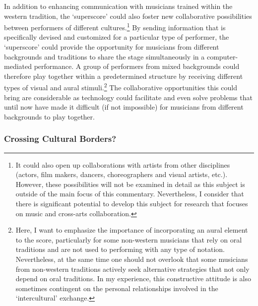 In addition to enhancing communication with musicians trained within the western tradition, the `superscore' could also foster new collaborative possibilities between performers of different cultures.\footnote{It could also open up collaborations with artists from other disciplines (actors, film makers, dancers, choreographers and visual artists, etc.). However, these possibilities will not be examined in detail as this subject is outside of the main focus of this commentary. Nevertheless, I consider that there is significant potential to develop this subject for research that focuses on music and cross-arts collaboration.} By sending information that is specifically devised and customized for a particular type of performer, the `superscore' could provide the opportunity for musicians from different backgrounds and traditions to share the stage simultaneously in a computer-mediated performance. A group of performers from mixed backgrounds could therefore play together within a predetermined structure by receiving different types of visual and aural stimuli.\footnote{Here, I want to emphasize the importance of incorporating an aural element to the score, particularly for some non-western musicians that rely on oral traditions and are not used to performing with any type of notation. Nevertheless,  at the same time one should not overlook that some musicians from non-western traditions actively seek alternative strategies that not only depend on oral traditions. In my experience, this constructive attitude is also sometimes contingent on the personal relationships involved in the `intercultural' exchange.} The collaborative opportunities this could bring are considerable as technology could facilitate and even solve problems that until now have made it difficult (if not impossible) for musicians from different backgrounds to play together.  

\subsubsection{Crossing Cultural Borders?}

